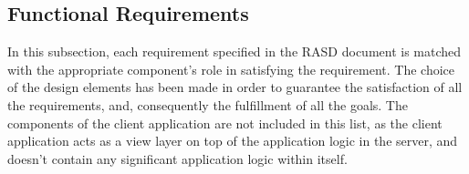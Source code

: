 \subsection{Functional Requirements}
In this subsection, each requirement specified in the RASD document is matched with the appropriate component's role in satisfying the requirement.
The choice of the design elements has been made in order to guarantee the satisfaction of all the requirements, and, consequently the fulfillment of all the goals.
The components of the client application are not included in this list, as the client application acts as a view layer on top of the application logic in the server, and doesn't contain any significant application logic within itself.

